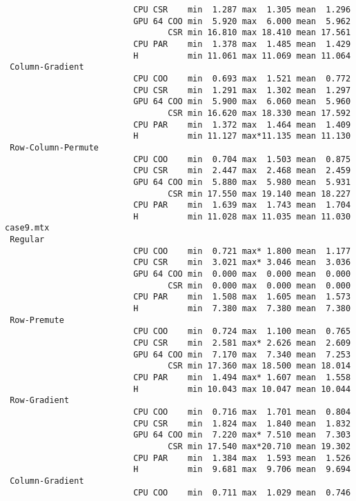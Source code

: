 {\begin{verbatim}
                          CPU CSR    min  1.287 max  1.305 mean  1.296
                          GPU 64 COO min  5.920 max  6.000 mean  5.962
                                 CSR min 16.810 max 18.410 mean 17.561
                          CPU PAR    min  1.378 max  1.485 mean  1.429
                          H          min 11.061 max 11.069 mean 11.064
 Column-Gradient
                          CPU COO    min  0.693 max  1.521 mean  0.772
                          CPU CSR    min  1.291 max  1.302 mean  1.297
                          GPU 64 COO min  5.900 max  6.060 mean  5.960
                                 CSR min 16.620 max 18.330 mean 17.592
                          CPU PAR    min  1.372 max  1.464 mean  1.409
                          H          min 11.127 max*11.135 mean 11.130
 Row-Column-Permute
                          CPU COO    min  0.704 max  1.503 mean  0.875
                          CPU CSR    min  2.447 max  2.468 mean  2.459
                          GPU 64 COO min  5.880 max  5.980 mean  5.931
                                 CSR min 17.550 max 19.140 mean 18.227
                          CPU PAR    min  1.639 max  1.743 mean  1.704
                          H          min 11.028 max 11.035 mean 11.030
case9.mtx
 Regular
                          CPU COO    min  0.721 max* 1.800 mean  1.177
                          CPU CSR    min  3.021 max* 3.046 mean  3.036
                          GPU 64 COO min  0.000 max  0.000 mean  0.000
                                 CSR min  0.000 max  0.000 mean  0.000
                          CPU PAR    min  1.508 max  1.605 mean  1.573
                          H          min  7.380 max  7.380 mean  7.380
 Row-Premute
                          CPU COO    min  0.724 max  1.100 mean  0.765
                          CPU CSR    min  2.581 max* 2.626 mean  2.609
                          GPU 64 COO min  7.170 max  7.340 mean  7.253
                                 CSR min 17.360 max 18.500 mean 18.014
                          CPU PAR    min  1.494 max* 1.607 mean  1.558
                          H          min 10.043 max 10.047 mean 10.044
 Row-Gradient
                          CPU COO    min  0.716 max  1.701 mean  0.804
                          CPU CSR    min  1.824 max  1.840 mean  1.832
                          GPU 64 COO min  7.220 max* 7.510 mean  7.303
                                 CSR min 17.540 max*20.710 mean 19.302
                          CPU PAR    min  1.384 max  1.593 mean  1.526
                          H          min  9.681 max  9.706 mean  9.694
 Column-Gradient
                          CPU COO    min  0.711 max  1.029 mean  0.746

\end{verbatim}}
